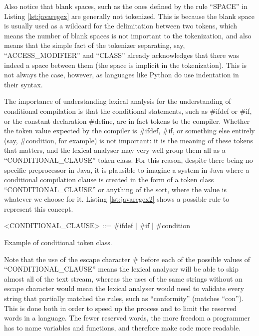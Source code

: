 Also notice that blank spaces, such as the ones defined by the rule ``SPACE'' in Listing \ref{lst:javaregex} are generally not tokenized. This is because the blank space is usually used as a wildcard for the delimitation between two tokens, which means the number of blank spaces is not important to the tokenization, and also means that the simple fact of the tokenizer separating, say, ``ACCESS_MODIFIER'' and ``CLASS'' already acknowledges that there was indeed a space between them (the space is implicit in the tokenization). This is not always the case, however, as languages like Python do use indentation in their syntax.

The importance of understanding lexical analysis for the understanding of conditional compilation is that the conditional statements, such as \#ifdef or \#if, or the constant declaration \#define, are in fact tokens to the compiler. Whether the token value expected by the compiler is \#ifdef, \#if, or something else entirely (say, \#condition, for example) is not important: it is the meaning of these tokens that matters, and the lexical analyser may very well group them all as a ``CONDITIONAL_CLAUSE'' token class. For this reason, despite there being no specific preprocessor in Java, it is plausible to imagine a system in Java where a conditional compilation clause is created in the form of a token class ``CONDITIONAL_CLAUSE'' or anything of the sort, where the value is whatever we choose for it. Listing \ref{lst:javaregex2} shows a possible rule to represent this concept.

\begin{listing}
\begin{grammar}
<CONDITIONAL_CLAUSE> ::= \#ifdef | \#if | \#condition
\end{grammar}
\caption{Example of conditional token class.} \label{lst:javaregex2}
\end{listing}

Note that the use of the escape character \# before each of the possible values of ``CONDITIONAL_CLAUSE'' means the lexical analyser will be able to skip almost all of the text stream, whereas the uses of the same strings without an escape character would mean the lexical analyser would need to validate every string that partially matched the rules, such as ``conformity'' (matches ``con''). This is done both in order to speed up the process and to limit the reserved words in a language. The fewer reserved words, the more freedom a programmer has to name variables and functions, and therefore make code more readable.

